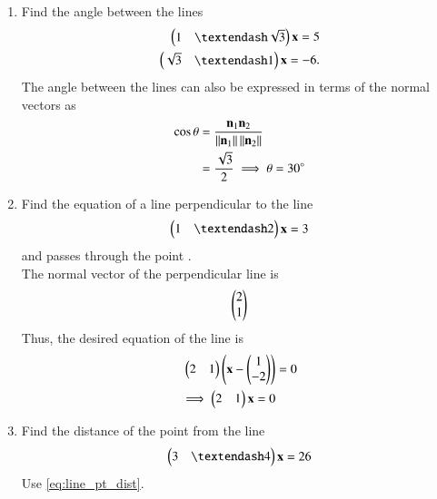 \begin{enumerate}[label=\arabic*.,ref=\thesubsection.\theenumi]
\item Find the angle between the lines 
%
\begin{align}
\myvec{1 & – \sqrt{3}}\vec{x}  = 5
\\
\myvec{\sqrt{3} & –1}\vec{x}  = -6
. 
\end{align}
%
\solution The angle between the lines can also be expressed in terms of the normal vectors as
%
\begin{align}
\cos \theta &= \frac{\mathbf{n}_1\mathbf{n}_2}{\left\lVert\mathbf{n}_1\right\rVert\left\lVert\mathbf{n}_2\right\rVert}
\\
&= \frac{\sqrt{3}}{2} \implies \theta = 30\degree
\end{align}
%
\item Find the equation of a line perpendicular to the line 
\begin{align}
\myvec{1 & – 2}\vec{x}  = 3
\end{align}
%
and passes through the point .
%
\\
\solution The normal vector of the perpendicular line is 
%
\begin{align}
\begin{pmatrix}2 \\ 1\end{pmatrix}
\end{align}
%
Thus, the desired equation of the line is 
%
\begin{align}
\begin{pmatrix}2 & 1\end{pmatrix}\left(\mathbf{x} - \begin{pmatrix}1\\-2\end{pmatrix}\right) &=0
\\
\implies \begin{pmatrix}2 & 1\end{pmatrix}\mathbf{x} =0
\end{align}
%

\item Find the distance of the point  from the line 
\begin{align}
\myvec{3 & – 4}\vec{x}  = 26
\end{align}
%
\solution Use \eqref{eq:line_pt_dist}.


\end{enumerate}
